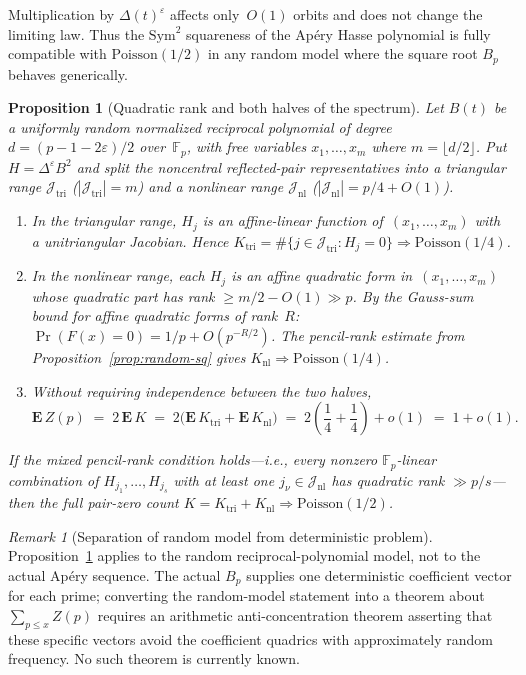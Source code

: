 \documentclass[11pt]{article}
\newtheorem{proposition}[theorem]{Proposition}
\theoremstyle{definition}
\theoremstyle{remark}
\newtheorem{remark}[theorem]{Remark}
\begin{document}
Multiplication by $\Delta(t)^\varepsilon$ affects only~$O(1)$
orbits and does not change the limiting law.
Thus the $\mathrm{Sym}^2$ squareness of the Ap\'ery Hasse
polynomial is fully compatible with $\mathrm{Poisson}(1/2)$
in any random model where the square root $B_p$ behaves
generically.

\begin{proposition}[Quadratic rank and both halves of the spectrum]%
\label{prop:quadratic-rank}
Let $B(t)$ be a uniformly random normalized reciprocal polynomial
of degree $d = (p-1-2\varepsilon)/2$ over~$\mathbb{F}_p$,
with free variables $x_1, \ldots, x_m$ where $m = \lfloor d/2 \rfloor$.
Put $H = \Delta^\varepsilon B^2$ and split the noncentral
reflected-pair representatives into a \emph{triangular} range
$\mathcal{J}_{\mathrm{tri}}$ ($|\mathcal{J}_{\mathrm{tri}}| = m$)
and a \emph{nonlinear} range
$\mathcal{J}_{\mathrm{nl}}$
($|\mathcal{J}_{\mathrm{nl}}| = p/4 + O(1)$).
\begin{enumerate}
\item[\textnormal{(i)}]
  In the triangular range, $H_j$ is an affine-linear function
  of~$(x_1,\ldots,x_m)$ with a unitriangular Jacobian.
  Hence $K_{\mathrm{tri}} = \#\{j \in \mathcal{J}_{\mathrm{tri}} :
  H_j = 0\} \Rightarrow \mathrm{Poisson}(1/4)$.
\item[\textnormal{(ii)}]
  In the nonlinear range, each $H_j$ is an affine quadratic
  form in~$(x_1,\ldots,x_m)$ whose quadratic part has rank
  $\ge m/2 - O(1) \gg p$.
  By the Gauss-sum bound for affine quadratic forms
  of rank~$R$:
  $\Pr(F(x) = 0) = 1/p + O(p^{-R/2})$.
  The pencil-rank estimate from
  Proposition~\ref{prop:random-sq} gives
  $K_{\mathrm{nl}} \Rightarrow \mathrm{Poisson}(1/4)$.
\item[\textnormal{(iii)}]
  Without requiring independence between the two halves,
  \[
    \mathbf{E}\,Z(p) \;=\; 2\,\mathbf{E}\,K
    \;=\; 2\bigl(\mathbf{E}\,K_{\mathrm{tri}}
      + \mathbf{E}\,K_{\mathrm{nl}}\bigr)
    \;=\; 2\!\left(\frac{1}{4} + \frac{1}{4}\right) + o(1)
    \;=\; 1 + o(1).
  \]
\end{enumerate}
If the mixed pencil-rank condition holds---i.e., every nonzero
$\mathbb{F}_p$-linear combination of $H_{j_1}, \ldots, H_{j_s}$
with at least one $j_\nu \in \mathcal{J}_{\mathrm{nl}}$ has
quadratic rank $\gg p/s$---then the full pair-zero count
$K = K_{\mathrm{tri}} + K_{\mathrm{nl}} \Rightarrow
\mathrm{Poisson}(1/2)$.
\end{proposition}

\begin{remark}[Separation of random model from deterministic problem]
Proposition~\ref{prop:quadratic-rank} applies to the
random reciprocal-polynomial model, not to the actual
Ap\'ery sequence.
The actual $B_p$ supplies one deterministic coefficient
vector for each prime; converting the random-model statement
into a theorem about $\sum_{p \le x} Z(p)$ requires
an arithmetic anti-concentration theorem asserting that these
specific vectors avoid the coefficient quadrics with
approximately random frequency.
No such theorem is currently known.
\end{remark}
\end{document}
